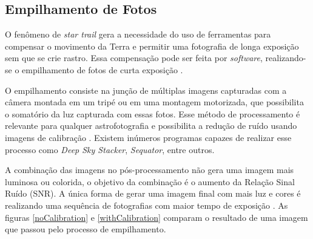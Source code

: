 \subsection{Empilhamento de Fotos}

O fenômeno de \textit{star trail} gera a necessidade do uso de ferramentas para compensar o movimento da Terra e permitir uma fotografia de longa exposição sem que se crie rastro. Essa compensação pode ser feita por \textit{software}, realizando-se o empilhamento de fotos de curta exposição \cite{livro:astropratica}.

O empilhamento consiste na junção de múltiplas imagens capturadas com a câmera montada em um tripé ou em uma montagem motorizada, que possibilita o somatório da luz capturada com essas fotos. Esse método de processamento é relevante para qualquer astrofotografia e possibilita a redução de ruído usando imagens de calibração \cite{book:bbcsky}. Existem inúmeros programas capazes de realizar esse processo como \textit{Deep Sky Stacker}, \textit{Sequator}, entre outros.

A combinação das imagens no pós-processamento não gera uma imagem mais luminosa ou colorida, o objetivo da combinação é o aumento da Relação Sinal Ruído (SNR). A única forma de gerar uma imagem final com mais luz e cores é realizando uma sequência de fotografias com maior tempo de exposição \cite{man:deepskystackerBetterImages}. As figuras \ref{noCalibration} e \ref{withCalibration} comparam o resultado de uma imagem que passou pelo processo de empilhamento. 



